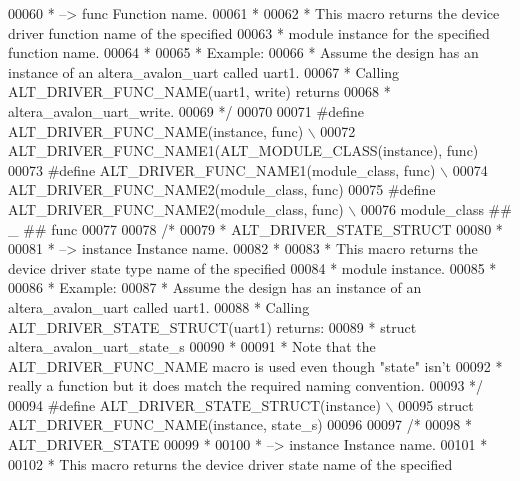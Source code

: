 \begin{DoxyCode}
00060 \textcolor{comment}{ *   --> func                   Function name.}
00061 \textcolor{comment}{ *}
00062 \textcolor{comment}{ * This macro returns the device driver function name of the specified}
00063 \textcolor{comment}{ * module instance for the specified function name.}
00064 \textcolor{comment}{ *}
00065 \textcolor{comment}{ * Example:}
00066 \textcolor{comment}{ *   Assume the design has an instance of an altera\_avalon\_uart called uart1.}
00067 \textcolor{comment}{ *   Calling ALT\_DRIVER\_FUNC\_NAME(uart1, write) returns }
00068 \textcolor{comment}{ *   altera\_avalon\_uart\_write.}
00069 \textcolor{comment}{ */}
00070 
00071 \textcolor{preprocessor}{#define ALT\_DRIVER\_FUNC\_NAME(instance, func) \(\backslash\)}
00072 \textcolor{preprocessor}{  ALT\_DRIVER\_FUNC\_NAME1(ALT\_MODULE\_CLASS(instance), func)}
00073 \textcolor{preprocessor}{#define ALT\_DRIVER\_FUNC\_NAME1(module\_class, func) \(\backslash\)}
00074 \textcolor{preprocessor}{  ALT\_DRIVER\_FUNC\_NAME2(module\_class, func)}
00075 \textcolor{preprocessor}{#define ALT\_DRIVER\_FUNC\_NAME2(module\_class, func) \(\backslash\)}
00076 \textcolor{preprocessor}{  module\_class ## \_ ## func}
00077 
00078 \textcolor{comment}{/*}
00079 \textcolor{comment}{ * ALT\_DRIVER\_STATE\_STRUCT}
00080 \textcolor{comment}{ *}
00081 \textcolor{comment}{ *   --> instance               Instance name.}
00082 \textcolor{comment}{ *}
00083 \textcolor{comment}{ * This macro returns the device driver state type name of the specified}
00084 \textcolor{comment}{ * module instance.}
00085 \textcolor{comment}{ *}
00086 \textcolor{comment}{ * Example:}
00087 \textcolor{comment}{ *   Assume the design has an instance of an altera\_avalon\_uart called uart1.}
00088 \textcolor{comment}{ *   Calling ALT\_DRIVER\_STATE\_STRUCT(uart1) returns:}
00089 \textcolor{comment}{ *     struct altera\_avalon\_uart\_state\_s}
00090 \textcolor{comment}{ *}
00091 \textcolor{comment}{ * Note that the ALT\_DRIVER\_FUNC\_NAME macro is used even though "state" isn't}
00092 \textcolor{comment}{ * really a function but it does match the required naming convention.}
00093 \textcolor{comment}{ */}
00094 \textcolor{preprocessor}{#define ALT\_DRIVER\_STATE\_STRUCT(instance) \(\backslash\)}
00095 \textcolor{preprocessor}{    struct ALT\_DRIVER\_FUNC\_NAME(instance, state\_s)}
00096 
00097 \textcolor{comment}{/*}
00098 \textcolor{comment}{ * ALT\_DRIVER\_STATE}
00099 \textcolor{comment}{ *}
00100 \textcolor{comment}{ *   --> instance               Instance name.}
00101 \textcolor{comment}{ *}
00102 \textcolor{comment}{ * This macro returns the device driver state name of the specified}

\end{DoxyCode}
